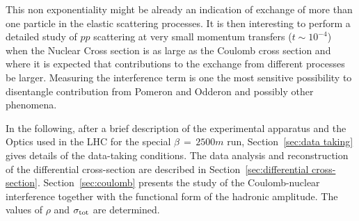 This non exponentiality might be already an indication of exchange of more than one particle in the elastic scattering processes.
It is then interesting to perform a detailed study of $pp$ scattering at very small momentum transfers ($t \sim 10^{-4}$) when the Nuclear Cross section is as large as the Coulomb cross section and where it is expected that contributions to the exchange from different processes be larger.
Measuring the interference term is one the most sensitive possibility to disentangle contribution from Pomeron and Odderon and possibly other phenomena.

In the following, after a brief description of the experimental apparatus and the Optics used in the LHC for the special $\beta\,=\,2500m$ run, Section~\ref{sec:data taking} gives details of the data-taking conditions.
 The data analysis and reconstruction of the differential cross-section are described in Section~\ref{sec:differential cross-section}. 
 Section~\ref{sec:coulomb} presents the study of the Coulomb-nuclear interference together with the functional form of the hadronic amplitude.  
The values of $\rho$ and $\sigma_{\rm tot}$ are determined.

